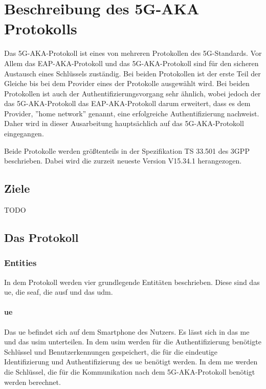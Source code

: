 \chapter{Beschreibung des 5G-AKA Protokolls}
\label{chap:2}

Das 5G-AKA-Protokoll ist eines von mehreren Protokollen des 5G-Standards.
Vor Allem das EAP-AKA-Protokoll und das 5G-AKA-Protokoll sind f\"ur den sicheren Austausch eines Schl\"ussels zust\"andig. 
Bei beiden Protokollen ist der erste Teil der Gleiche bis bei dem Provider eines der Protokolle ausgew\"ahlt wird. %
Bei beiden Protokollen ist auch der Authentifizierungsvorgang sehr \"ahnlich, wobei jedoch der das 5G-AKA-Protokoll das EAP-AKA-Protokoll darum erweitert, dass es dem Provider, ''home network'' genannt, eine erfolgreiche Authentifizierung nachweist. %
Daher wird in dieser Ausarbeitung haupts\"achlich auf das 5G-AKA-Protokoll eingegangen.

Beide Protokolle werden gr\"o{\ss}tenteils in der Spezifikation TS 33.501 des 3GPP beschrieben.%
Dabei wird die zurzeit neueste Version V15.34.1 herangezogen.

\section{Ziele}

TODO

\section{Das Protokoll}

\subsection{Entities}

In dem Protokoll werden vier grundlegende Entit\"aten beschrieben.
Diese sind das \gls{ue}, die \gls{seaf}, die \gls{ausf} und das \gls{udm}.

\subsubsection{\gls{ue}}

Das \gls{ue} befindet sich auf dem Smartphone des Nutzers.
Es l\"asst sich in das \gls{me} und das \gls{usim} unterteilen.
In dem \gls{usim} werden f\"ur die Authentifizierung ben\"otigte Schl\"ussel und Benutzerkennungen gespeichert, die f\"ur die eindeutige Identifizierung und Authentifizierung des \gls{ue} ben\"otigt werden. %
In dem \gls{me} werden die Schl\"ussel, die f\"ur die Kommunikation nach dem 5G-AKA-Protokoll ben\"otigt werden berechnet.

